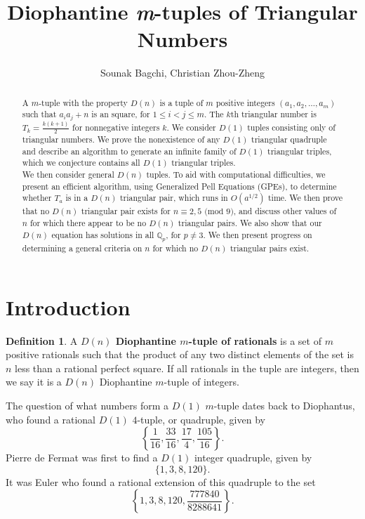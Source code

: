 \documentclass[12pt]{amsart}
\theoremstyle{theorem}
\theoremstyle{definition}
\newtheorem*{definition}{Definition}
\theoremstyle{plain}
\begin{document}
\title{Diophantine \emph{m}-tuples of Triangular Numbers}
\author{Sounak Bagchi, Christian Zhou-Zheng}
\maketitle
\begin{abstract}
    
A $m$-tuple with the property $D(n)$ is a tuple of $m$ positive integers $(a_1, a_2, \dots, a_m)$ such that  $a_i a_j + n$ is an square, for $1 \le i < j \le m$. The $k$th triangular number is $T_k = \frac{k(k+1)}{2}$ for nonnegative integers $k$. We consider $D(1)$ tuples consisting only of triangular numbers. We prove the nonexistence of any $D(1)$ triangular quadruple and describe an algorithm to generate an infinite family of $D(1)$ triangular triples, which we conjecture contains all $D(1)$ triangular triples.
\\

We then consider general $D(n)$ tuples. To aid with computational difficulties, we present an efficient algorithm, using Generalized Pell Equations (GPEs), to determine whether $T_a$ is in a $D(n)$ triangular pair, which runs in $O(a^{1/2})$ time. We then prove that no $D(n)$ triangular pair exists for $n \equiv 2,5 \text{ (mod } 9\text{)}$, and discuss other values of $n$ for which there appear to be no $D(n)$ triangular pairs. We also show that our $D(n)$ equation has solutions in all $\mathbb{Q}_p$, for $p \neq 3$. We then present progress on determining a general criteria on $n$ for which no $D(n)$ triangular pairs exist.
\end{abstract}


\section{Introduction} \label{prelims}
\begin{definition}
    A \textbf{$D(n)$ Diophantine $m$-tuple of rationals} is a set of $m$ positive rationals such that the product of any two distinct elements of the set is $n$ less than a rational perfect square. If all rationals in the tuple are integers, then we say it is a $D(n)$ Diophantine $m$-tuple of integers.
\end{definition}

The question of what numbers form a $D(1)$ $m$-tuple dates back to Diophantus, who found a rational $D(1)$ $4$-tuple, or quadruple, given by $$\left\{\frac{1}{16}, \frac{33}{16}, \frac{17}{4}, \frac{105}{16} \right\}.$$ Pierre de Fermat was first to find a $D(1)$ integer quadruple, given by
$$\{1, 3, 8, 120 \}.$$
It was Euler \cite{b4} who found a rational extension of this quadruple to the set $$\left\{1, 3, 8, 120, \frac{777840}{8288641} \right\}.$$
\end{document}
